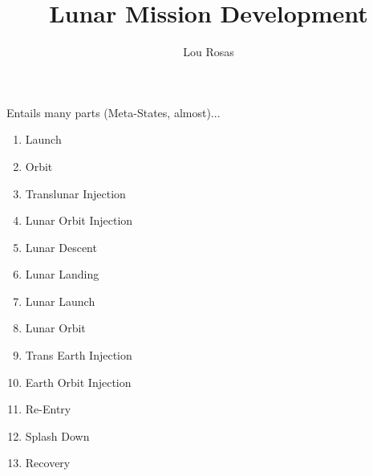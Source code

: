 \documentclass[letterpaper]{article}
\begin{document}
\author{Lou Rosas}
\title{Lunar Mission Development}
\maketitle

Entails many parts (Meta-States, almost)...
\begin{enumerate}
   \item Launch
   \item Orbit
   \item Translunar Injection
   \item Lunar Orbit Injection
   \item Lunar Descent
   \item Lunar Landing
   \item Lunar Launch
   \item Lunar Orbit
   \item Trans Earth Injection
   \item Earth Orbit Injection
   \item Re-Entry
   \item Splash Down
   \item Recovery
\end{enumerate}
\end{document}
